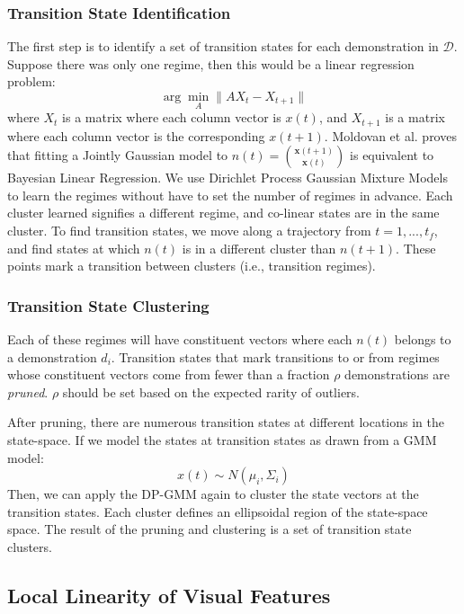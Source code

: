 \subsubsection{Transition State Identification}
The first step is to identify a set of transition states for each demonstration in $\mathcal{D}$.
Suppose there was only one regime, then this would be a linear regression problem:
\[
\arg\min_A \|A X_t - X_{t+1}\|
\]
where $X_t$ is a matrix where each column vector is $x(t)$, and $X_{t+1}$ is a matrix where each column vector is the corresponding $x(t+1)$.
Moldovan et al. \cite{moldovan2013dirichlet} proves that fitting a Jointly Gaussian model to $n(t) = \binom{\mathbf{x}(t+1)}{\mathbf{x}(t)}$ is equivalent to Bayesian Linear Regression.
We use Dirichlet Process Gaussian Mixture Models to learn the regimes without have to set the number of regimes in advance.
Each cluster learned signifies a different regime, and co-linear states are in the same cluster.
To find transition states, we move along a trajectory from $t=1,...,t_f$, and find states at which $n(t)$ is in a different cluster than $n(t+1)$.
These points mark a transition between clusters (i.e., transition regimes).


\subsubsection{Transition State Clustering}\label{prun}
Each of these regimes will have constituent vectors where each $n(t)$ belongs to a demonstration $d_i$. 
Transition states that mark transitions to or from regimes whose constituent vectors come from fewer than a fraction $\rho$ demonstrations are \emph{pruned}.
$\rho$ should be set based on the expected rarity of outliers.

After pruning, there are numerous transition states at different locations in the state-space.
If we model the states at transition states as drawn from a GMM model:
\[
{x}(t) \sim N(\mu_i, \Sigma_i)
\]
Then, we can apply the DP-GMM again to cluster the state vectors at the transition states.
Each cluster defines an ellipsoidal region of the state-space space.
The result of the pruning and clustering is a set of transition state clusters.

\subsection{Local Linearity of Visual Features}

